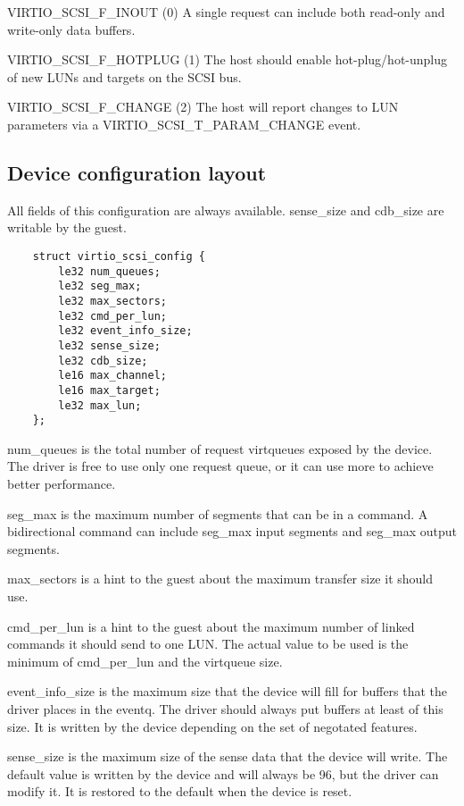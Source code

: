   VIRTIO_SCSI_F_INOUT (0) A single request can include both
    read-only and write-only data buffers.

  VIRTIO_SCSI_F_HOTPLUG (1) The host should enable
    hot-plug/hot-unplug of new LUNs and targets on the SCSI bus.

  VIRTIO_SCSI_F_CHANGE (2) The host will report changes to LUN
    parameters via a VIRTIO_SCSI_T_PARAM_CHANGE event.

\subsection{Device configuration layout}\label{sec:Device Types / SCSI Host Device / Device configuration layout}

  All fields of this configuration are always available. sense_size
  and cdb_size are writable by the guest.

\begin{lstlisting}
	struct virtio_scsi_config {
		le32 num_queues;
		le32 seg_max;
		le32 max_sectors;
		le32 cmd_per_lun;
		le32 event_info_size;
		le32 sense_size;
		le32 cdb_size;
		le16 max_channel;
		le16 max_target;
		le32 max_lun;
	};
\end{lstlisting}

  num_queues is the total number of request virtqueues exposed by
    the device. The driver is free to use only one request queue,
    or it can use more to achieve better performance.

  seg_max is the maximum number of segments that can be in a
    command. A bidirectional command can include seg_max input
    segments and seg_max output segments.

  max_sectors is a hint to the guest about the maximum transfer
    size it should use.

  cmd_per_lun is a hint to the guest about the maximum number of
    linked commands it should send to one LUN. The actual value
    to be used is the minimum of cmd_per_lun and the virtqueue
    size.

  event_info_size is the maximum size that the device will fill
    for buffers that the driver places in the eventq. The driver
    should always put buffers at least of this size. It is
    written by the device depending on the set of negotated
    features.

  sense_size is the maximum size of the sense data that the
    device will write. The default value is written by the device
    and will always be 96, but the driver can modify it. It is
    restored to the default when the device is reset.

